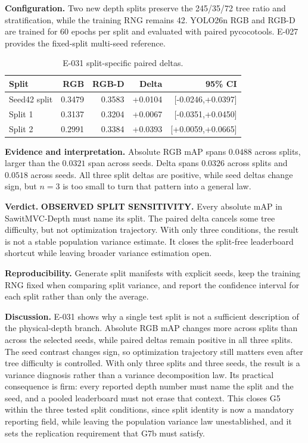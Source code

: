 \documentclass[preprint,12pt]{elsarticle}
\begin{document}
\textbf{Configuration.} Two new depth splits preserve the 245/35/72 tree
ratio and stratification, while the training RNG remains 42. YOLO26n RGB and
RGB-D are trained for 60 epochs per split and evaluated with paired
pycocotools. E-027 provides the fixed-split multi-seed reference.

\begin{table}[H]
\centering
\caption{E-031 split-specific paired deltas.}
\label{tab:e031}
\begin{tabular}{lrrrr}
\toprule
Split & RGB & RGB-D & Delta & 95\% CI\\
\midrule
Seed42 split & 0.3479 & 0.3583 & +0.0104 & [-0.0246,+0.0397]\\
Split 1 & 0.3137 & 0.3204 & +0.0067 & [-0.0351,+0.0450]\\
Split 2 & 0.2991 & 0.3384 & +0.0393 & [+0.0059,+0.0665]\\
\bottomrule
\end{tabular}
\end{table}

\textbf{Evidence and interpretation.} Absolute RGB mAP spans \(0.0488\)
across splits, larger than the \(0.0321\) span across seeds. Delta spans
\(0.0326\) across splits and \(0.0518\) across seeds. All three split deltas
are positive, while seed deltas change sign, but \(n=3\) is too small to turn
that pattern into a general law.

\textbf{Verdict.} \textbf{OBSERVED SPLIT SENSITIVITY.} Every absolute mAP in
SawitMVC-Depth must name its split. The paired delta cancels some tree
difficulty, but not optimization trajectory. With only three conditions, the
result is not a stable population variance estimate. It closes the split-free
leaderboard shortcut while leaving broader variance estimation open.

\textbf{Reproducibility.} Generate split manifests with explicit seeds, keep
the training RNG fixed when comparing split variance, and report the
confidence interval for each split rather than only the average.

\textbf{Discussion.} E-031 shows why a single test split is not a sufficient
description of the physical-depth branch. Absolute RGB mAP changes more
across splits than across the selected seeds, while paired deltas remain
positive in all three splits. The seed contrast changes sign, so optimization
trajectory still matters even after tree difficulty is controlled. With only
three splits and three seeds, the result is a variance diagnosis rather than
a variance decomposition law. Its practical consequence is firm: every
reported depth number must name the split and the seed, and a pooled
leaderboard must not erase that context. This closes G5 within the three
tested split conditions, since split identity is now a mandatory reporting
field, while leaving the population variance law unestablished, and it sets
the replication requirement that G7b must satisfy.
\end{document}
